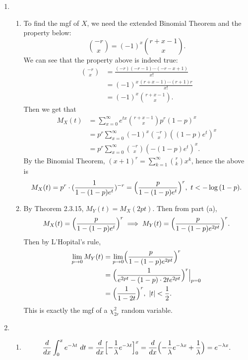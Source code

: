 \documentclass{article}
\begin{document}
\begin{enumerate}
    \item \begin{enumerate}
        \item To find the mgf of $X$, we need the extended Binomial Theorem and the property below: 
        \[ \binom{-r}{x} = (-1)^x \binom{r + x - 1}{x}. \]
        We can see that the property above is indeed true: 
        \begin{align*}
            \binom{-r}{x} 
            &= \frac{(-r)(-r-1)\cdots(-r - x + 1)}{x!} \\
            &= (-1)^x \frac{(r + x - 1)\cdots(r + 1)r}{x!} \\
            &= (-1)^x \binom{r + x - 1}{x}.
        \end{align*}
        Then we get that 
        \begin{align*}
            M_X(t) 
            &= \sum_{x = 0}^{\infty} e^{tx} \binom{r + x - 1}{x} p^r (1 - p)^x \\
            &= p^r \sum_{x = 0}^{\infty} (-1)^x \binom{-r}{x} ((1 - p)e^t)^x \\
            &= p^r \sum_{x = 0}^{\infty} \binom{-r}{x} (-(1 - p)e^t)^x.
        \end{align*}
        By the Binomial Theorem, $(x + 1)^r = \sum_{k = 1}^{\infty} \binom{r}{k} x^k$, hence the above is 
        \[ M_X(t) = p^r \cdot (\frac{1}{1 - (1 - p)e^t})^{-r} 
        = \Bigl( \frac{p}{1 - (1 - p)e^t} \Bigr)^r, \ t < -\log{(1 - p)}. \]

        \item By Theorem 2.3.15, $M_Y(t) = M_X(2pt)$. Then from part (a), 
        \[ M_X(t) = \Bigl( \frac{p}{1 - (1 - p)e^t} \Bigr)^r 
        \implies M_Y(t) = \Bigl( \frac{p}{1 - (1 - p)e^{2pt}} \Bigr)^r. \]
        Then by L'Hopital's rule, 
        \begin{align*}
            \lim_{p \to 0} M_Y(t) 
            &= \lim_{p \to 0} \Bigl( \frac{p}{1 - (1 - p)e^{2pt}} \Bigr)^r \\
            &= \Bigl( \frac{1}{e^{2pt} - (1 - p) \cdot 2te^{2pt}} \Bigr)^r \Big|_{p = 0} \\
            &= \Bigl( \frac{1}{1 - 2t} \Bigr)^r, \ |t| < \frac{1}{2}.
        \end{align*}
        This is exactly the mgf of a $\chi^2_{2r}$ random variable.
    \end{enumerate}

    \item \begin{enumerate}
        \item \[ \frac{d}{dx} \int_{0}^{x} e^{-\lambda t} \ dt 
        = \frac{d}{dx} \Bigl[ -\frac{1}{\lambda}e^{-\lambda t} \Bigr]_0^x 
        = \frac{d}{dx} \Bigl( -\frac{1}{\lambda}e^{-\lambda x} + \frac{1}{\lambda} \Bigr)
        = e^{-\lambda x}. \]


\end{enumerate}
\end{enumerate}
\end{document}

